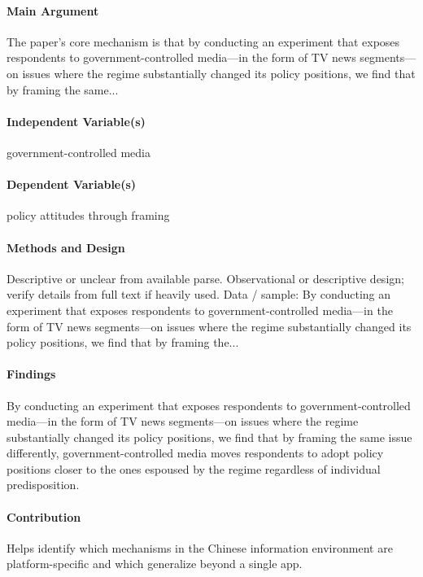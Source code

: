 \documentclass[12pt]{article}
\begin{document}
\paragraph{Main Argument} The paper's core mechanism is that by conducting an experiment that exposes respondents to government-controlled media---in the form of TV news segments---on issues where the regime substantially changed its policy positions, we find that by framing the same...

\paragraph{Independent Variable(s)} government-controlled media

\paragraph{Dependent Variable(s)} policy attitudes through framing

\paragraph{Methods and Design} Descriptive or unclear from available parse. Observational or descriptive design; verify details from full text if heavily used. Data / sample: By conducting an experiment that exposes respondents to government-controlled media---in the form of TV news segments---on issues where the regime substantially changed its policy positions, we find that by framing the...

\paragraph{Findings} By conducting an experiment that exposes respondents to government-controlled media---in the form of TV news segments---on issues where the regime substantially changed its policy positions, we find that by framing the same issue differently, government-controlled media moves respondents to adopt policy positions closer to the ones espoused by the regime regardless of individual predisposition.

\paragraph{Contribution} Helps identify which mechanisms in the Chinese information environment are platform-specific and which generalize beyond a single app.
\end{document}
